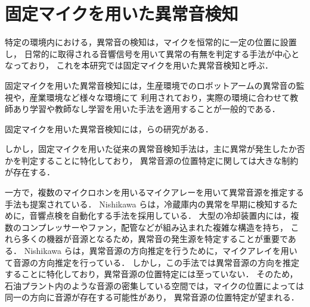 \documentclass[../main]{subfiles}
\begin{document}
\section{固定マイクを用いた異常音検知}
\label{sec:anomaly}
特定の環境内における，異常音の検知は，マイクを恒常的に一定の位置に設置し，
日常的に取得される音響信号を用いて異常の有無を判定する手法が中心となっており，
これを本研究では固定マイクを用いた異常音検知と呼ぶ．


固定マイクを用いた異常音検知には，生産環境でのロボットアームの異常音の監視や，産業環境など様々な環境にて
利用されており，実際の環境に合わせて教師あり学習や教師なし学習を用いた手法を適用することが一般的である．

固定マイクを用いた異常音検知には，らの研究がある．

しかし，固定マイクを用いた従来の異常音検知手法は，主に異常が発生したか否かを判定することに特化しており，
異常音源の位置特定に関しては大きな制約が存在する．

一方で，複数のマイクロホンを用いるマイクアレーを用いて異常音源を推定する手法も提案されている．
Nishikawa らは，冷蔵庫内の異常を早期に検知するために，音響点検を自動化する手法を採用している．
大型の冷却装置内には，複数のコンプレッサーやファン，配管などが組み込まれた複雑な構造を持ち，
これら多くの機器が音源となるため，異常音の発生源を特定することが重要である．
Nishikawa らは，異常音源の方向推定を行うために，マイクアレイを用いて音源の方向推定を行っている．
しかし，この手法では異常音源の方向を推定することに特化しており，異常音源の位置特定には至っていない．
そのため，石油プラント内のような音源の密集している空間では，マイクの位置によっては同一の方向に音源が存在する可能性があり，
異常音源の位置特定が望まれる．
\end{document}
